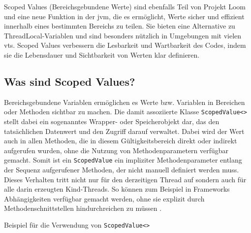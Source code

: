     Scoped Values (Bereichsgebundene Werte) sind ebenfalls Teil von Projekt Loom und eine neue Funktion in der \gls{jvm}, die es ermöglicht,
    Werte sicher und effizient innerhalb eines bestimmten Bereichs zu teilen.
    Sie bieten eine Alternative zu ThreadLocal-Variablen und sind besonders nützlich in Umgebungen mit vielen \Glspl{vt}. 
    Scoped Values verbessern die Lesbarkeit und Wartbarkeit des Codes, indem sie die Lebensdauer und Sichtbarkeit von Werten klar definieren.
    
\subsection{Was sind Scoped Values?}
\label{subsec:WasSindSV?}
    Bereichsgebundene Variablen ermöglichen es Werte bzw. Variablen in Bereichen oder Methoden sichtbar zu machen. 
    Die damit assoziierte Klasse \texttt{ScopedValue<>} stellt dabei ein sogenanntes Wrapper- oder Speicherobjekt dar, das den tatsächlichen Datenwert und den Zugriff darauf verwaltet.
    Dabei wird der Wert auch in allen Methoden, die in diesem Gültigkeitsbereich direkt oder indirekt aufgerufen wurden, ohne die Nutzung von Methodenparametern verfügbar gemacht.
    Somit ist ein \texttt{ScopedValue} ein impliziter Methodenparameter entlang der Sequenz aufgerufener Methoden, der nicht manuell definiert werden muss.
    Dieses Verhalten tritt nicht nur für den derzeitigen Thread auf sondern auch für alle darin erzeugten Kind-Threads.
    So können zum Beispiel in Frameworks Abhängigkeiten verfügbar gemacht werden, ohne sie explizit durch Methodenschnittstellen hindurchreichen zu müssen \cite{JEP481}. 
    \begin{program} [H]
        \caption{Beispiel für die Verwendung von \texttt{ScopedValue<>}}
        \label{prog:VerwendungVonSV}
    \begin{JavaCode}[language=Java, numbers=left]
public class ScopedValueExample {
    private static final ScopedValue<String> someName = ScopedValue.newInstance();
    private static final ScopedValue<String> someName2 = ScopedValue.newInstance();

    public static void main(String[] args) {
        ScopedValue.Carrier carrier = ScopedValue.where(someName, "Alice");
        carrier.where(someName2, "Herbert").run(()->{
            System.out.println(STR."Name: \{someName2.get()}");
            printName();
            ScopedValue.where(someName, "Bob").run(ScopedValueExample::printName);
            System.out.println(STR."Name: \{someName.get()}");
        });
        if (someName.isBound()) {
            System.out.println(STR."Name: \{someName.get()}");
        } else {
            System.out.println(STR."someName is not bound");
        }
    }

    private static void printName() {
        System.out.println(STR."Name: \{someName.get()}");
    }
}\end{JavaCode}
    \end{program}   
